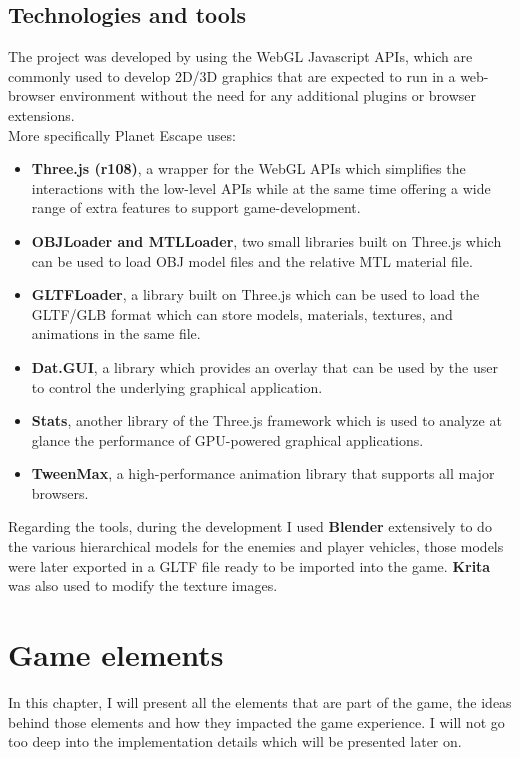 \documentclass[a4paper,11pt]{article}
\begin{document}
\subsection{Technologies and tools}
The project was developed by using the WebGL Javascript APIs, which are commonly used to develop 2D/3D graphics that are expected to run in a web-browser environment without the need for any additional plugins or browser extensions.\\
More specifically Planet Escape uses:
\begin{itemize}
    \item\textbf{ Three.js (r108)}, a wrapper for the WebGL APIs which simplifies the interactions with the low-level APIs while at the same time offering a wide range of extra features to support game-development.
    \item \textbf{OBJLoader and MTLLoader}, two small libraries built on Three.js which can be used to load OBJ model files and the relative MTL material file.
    \item \textbf{GLTFLoader}, a library built on Three.js which can be used to load the GLTF/GLB format which can store models, materials, textures, and animations in the same file.
    \item \textbf{Dat.GUI}, a library which provides an overlay that can be used by the user to control the underlying graphical application.
    \item \textbf{Stats}, another library of the Three.js framework which is used to analyze at glance the performance of GPU-powered graphical applications.
    \item \textbf{TweenMax}, a high-performance animation library that supports all major browsers.
\end{itemize}
Regarding the tools, during the development I used \textbf{Blender} extensively to do the various hierarchical models for the enemies and player vehicles, those models were later exported in a GLTF file ready to be imported into the game.
\textbf{Krita} was also used to modify the texture images.
\section{Game elements}
In this chapter, I will present all the elements that are part of the game, the ideas behind those elements and how they impacted the game experience.
I will not go too deep into the implementation details which will be presented later on.
\end{document}
